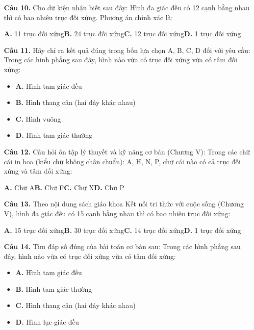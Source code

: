 \documentclass[11pt,a4paper]{article}
\begin{document}
\textbf{\color{primary} Câu 10.} Cho dữ kiện nhận biết sau đây: Hình đa giác đều có 12 cạnh bằng nhau thì có bao nhiêu trục đối xứng. Phương án chính xác là:\par
\hspace*{1.5em}\textbf{A.} 11 trục đối xứng\quad\quad \textbf{B.} 24 trục đối xứng\quad\quad \textbf{C.} 12 trục đối xứng\quad\quad \textbf{D.} 1 trục đối xứng\par\vspace{2pt}
\textbf{\color{primary} Câu 11.} Hãy chỉ ra kết quả đúng trong bốn lựa chọn A, B, C, D đối với yêu cầu: Trong các hình phẳng sau đây, hình nào vừa có trục đối xứng vừa có tâm đối xứng:\par
\begin{itemize}\setlength{\itemsep}{1pt}\setlength{\parskip}{0pt}
  \item[] \textbf{A.} Hình tam giác đều
  \item[] \textbf{B.} Hình thang cân (hai đáy khác nhau)
  \item[] \textbf{C.} Hình vuông
  \item[] \textbf{D.} Hình tam giác thường
\end{itemize}\vspace{2pt}
\textbf{\color{primary} Câu 12.} Câu hỏi ôn tập lý thuyết và kỹ năng cơ bản (Chương V): Trong các chữ cái in hoa (kiểu chữ không chân chuẩn): A, H, N, P, chữ cái nào có cả trục đối xứng và tâm đối xứng:\par
\hspace*{1.5em}\textbf{A.} Chữ A\quad\quad \textbf{B.} Chữ F\quad\quad \textbf{C.} Chữ X\quad\quad \textbf{D.} Chữ P\par\vspace{2pt}
\textbf{\color{primary} Câu 13.} Theo nội dung sách giáo khoa Kết nối tri thức với cuộc sống (Chương V), hình đa giác đều có 15 cạnh bằng nhau thì có bao nhiêu trục đối xứng:\par
\hspace*{1.5em}\textbf{A.} 15 trục đối xứng\quad\quad \textbf{B.} 30 trục đối xứng\quad\quad \textbf{C.} 14 trục đối xứng\quad\quad \textbf{D.} 1 trục đối xứng\par\vspace{2pt}
\textbf{\color{primary} Câu 14.} Tìm đáp số đúng của bài toán cơ bản sau: Trong các hình phẳng sau đây, hình nào vừa có trục đối xứng vừa có tâm đối xứng:\par
\begin{itemize}\setlength{\itemsep}{1pt}\setlength{\parskip}{0pt}
  \item[] \textbf{A.} Hình tam giác đều
  \item[] \textbf{B.} Hình tam giác thường
  \item[] \textbf{C.} Hình thang cân (hai đáy khác nhau)
  \item[] \textbf{D.} Hình lục giác đều
\end{itemize}\vspace{2pt}
\end{document}
